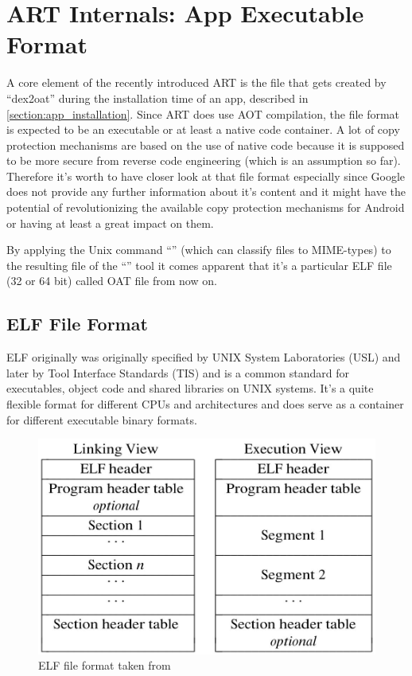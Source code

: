 \chapter{ART Internals: App Executable Format}
\label{chapter:art_oat_file_inspection}

A core element of the recently introduced ART is the file that
gets created by ``dex2oat'' during the installation time of an app,
described in \autoref{section:app_installation}.
Since ART does use AOT compilation, the file format is expected
to be an executable or at least a native code container.
A lot of copy protection mechanisms are based on the use of native
code because it is supposed to be more secure from reverse code
engineering (which is an assumption so far).
Therefore it's worth to have closer look at that file format
especially since Google does not provide any further information
about it's content and it might have the potential of
revolutionizing the available copy protection mechanisms for
Android or having at least a great impact on them.

By applying the Unix command ``'' (which can classify
files to MIME-types) to the resulting file of the ``''
tool it comes apparent that it's a particular ELF file (32 or 64 bit)
called OAT file from now on.

\section{ELF File Format}\label{section:elf_file_format}
ELF originally was originally specified by UNIX System Laboratories
(USL) and later by Tool Interface Standards (TIS) and is a common
standard for executables, object code and shared libraries on UNIX
systems. It's a quite flexible format for different CPUs and
architectures and does serve as a container for different
executable binary formats.

\begin{figure}[htb]
  \centering
  \includegraphics[scale=0.4]{figures/elf_format}
  \caption[ELF file format]{ELF file format taken from \parencite{portable_formats_spec}}
  \label{fig:elf_format}
\end{figure}

